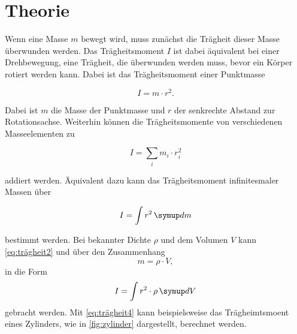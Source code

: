 \section{Theorie}
\label{sec:Theorie}




Wenn eine Masse $m$ bewegt wird, muss zunächst die Trägheit dieser Masse überwunden werden. Das Trägheitsmoment $I$ ist dabei äquivalent bei einer Drehbewegung, eine Trägheit, die überwunden werden muss, bevor ein Körper rotiert werden kann. Dabei ist das Trägheitsmoment einer Punktmasse

\begin{equation}
    I = m \cdot r^2.
    \label{eq:trägheit1}
\end{equation}

Dabei ist $m$ die Masse der Punktmasse und $r$ der senkrechte Abstand zur Rotationsachse. Weiterhin können die Trägheitsmomente von verschiedenen Masseelementen zu 

\begin{equation}
    I = \sum _i m_i \cdot r_i^2
    \label{eq:trägheit2}
\end{equation}

addiert werden. Äquivalent dazu kann das Trägheitsmoment infinitesmaler Massen über 

\begin{equation}
    I = \int r^2 \dif{m}
    \label{eq:trägheit3}
\end{equation}

bestimmt werden. Bei bekannter Dichte $\rho$ und dem Volumen $V$ kann \autoref{eq:trägheit2} und über den Zusammenhang
\begin{equation}
    m = \rho \cdot V,
    \label{eq:dichte}
\end{equation}
in die Form 
\begin{equation}
    I = \int r^2 \cdot \rho \dif{V}
    \label{eq:trägheit4}
\end{equation}
gebracht werden. 
Mit \autoref{eq:trägheit4} kann beispielsweise das Trägheimtsmoent eines Zylinders, wie in \autoref{fig:zylinder} dargestellt, berechnet werden.

